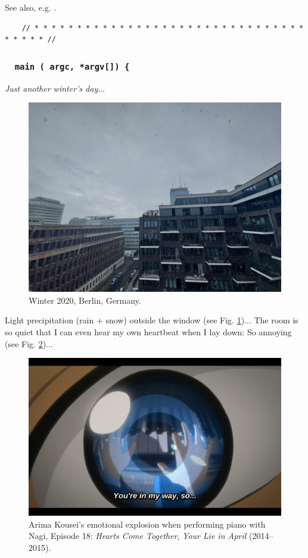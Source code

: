\documentclass[12pt]{article}
\begin{document}
See also, e.g. \cite{NASEM2020,NhuTrang2020}.

\begin{verbatim}
	// * * * * * * * * * * * * * * * * * * * * * * * * * * * * * * * * * * * * * //
\end{verbatim}

\subsubsection{{\tt {\color{cyan}{\it int}} {\color{YellowGreen} main} ({\color{cyan}{\it int}} argc, {\color{cyan}{\it char}} *argv[]) \{}}

 {\it Just another winter's day}$\ldots$

\begin{figure}[H]
	\centering
	\includegraphics[width = 15cm]{Berlin_winter2020}
	\caption{Winter 2020, Berlin, Germany.}
	\label{fig1}
\end{figure}
Light precipitation (rain $+$ snow) outside the window (see Fig. \ref{fig1})$\ldots$ The room is so quiet that I can even hear my own heartbeat when I lay down: So annoying (see Fig. \ref{fig2})$\ldots$

\begin{figure}[H]
	\centering
	\includegraphics[width = 15cm]{Arima_Kousei_you_are_in_my_way}
	\caption{Arima Kousei's emotional explosion when performing piano with Nagi, Episode 18: {\it Hearts Come Together}, {\it Your Lie in April} (2014--2015).}
	\label{fig2}
\end{figure}
\end{document}
